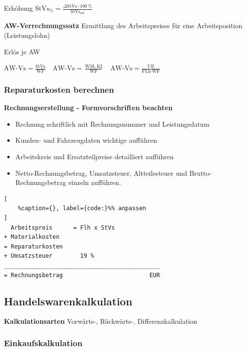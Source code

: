 Erhöhung
$\boxed{\text{StVs}_\% = \frac{\Delta \text{StVs} \cdot 100~\%}{\text{StVs}_{alt}}}$

\textbf{AW-Verrechnungssatz} Ermittlung des Arbeitspreises für eine
Arbeitsposition (Leistungslohn)

Erlös je AW

$\boxed{\text{AW-Vs} = \frac{\text{StVs}}{\text{WF}}} \quad \boxed{\text{AW-Vs} = \frac{\text{WSL} \cdot \text{KI}}{\text{WF}}} \quad \boxed{\text{AW-Vs} = \frac{\text{UE}}{\text{FLh} \cdot \text{WF}}}$

\subsubsection{Reparaturkosten
berechnen}\label{reparaturkosten-berechnen}

\textbf{Rechnungserstellung - Formvorschriften beachten}

\begin{itemize}
\item
  Rechnung schriftlich mit Rechnungsnummer und Leistungsdatum
\item
  Kunden- und Fahrzeugdaten wichtige aufführen
\item
  Arbeitskreis und Ersatzteilpreise detailliert aufführen
\item
  Netto-Rechnungsbetrag, Umsatzsteuer, Altteilesteuer und
  Brutto-Rechnungsbetrag einzeln aufführen.
\end{itemize}

\lstset{language=Bash}%
\begin{lstlisting}[
	%caption={}, label={code:}%% anpassen
]
  Arbeitspreis      = Flh x StVs
+ Materialkosten  
= Reparaturkosten 
+ Umsatzsteuer        19 % 
_____________________________________________
= Rechnungsbetrag                         EUR
\end{lstlisting}

\newpage

\subsection{Handelswarenkalkulation}\label{handelswarenkalkulation}

\textbf{Kalkulationsarten} Vorwärts-, Rückwärts-, Differenzkalkulation

\subsubsection{Einkaufskalkulation}\label{einkaufskalkulation}

